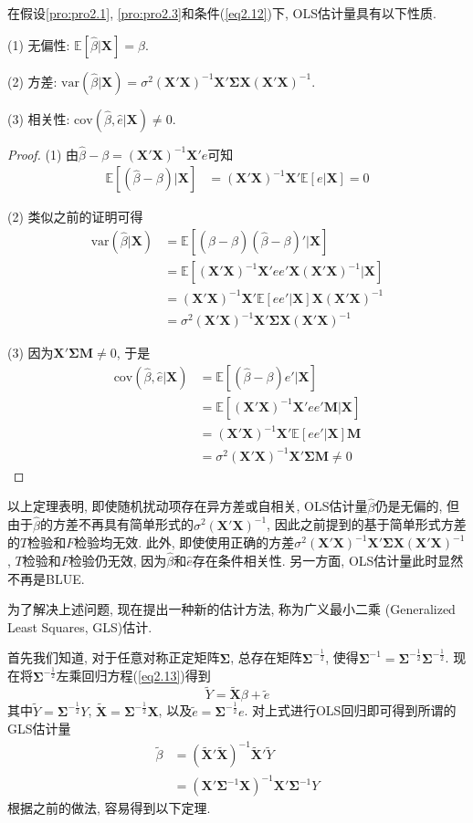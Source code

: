 \documentclass[cn, 12pt, math=mtpro2, bibstyle=apa, blue, twocol]{elegantbook}
\newcommand{\E}{\mathbb{E}}
\newcommand{\var}{\text{var}}
\newcommand{\X}{\mathbold{X}}
\newcommand{\hb}{\hat{\beta}}
\begin{document}
\begin{theorem}
  在假设\ref{pro:pro2.1}, \ref{pro:pro2.3}和条件(\ref{eq2.12})下, OLS估计量具有以下性质.

  (1) 无偏性: $\E[\hb|\X]=\beta$.

  (2) 方差: $\var(\hb|\X)=\sigma^2(\X'\X)^{-1}\X'\mathbold{\Sigma}\X(\X'\X)^{-1}$.

  (3) 相关性: $\text{cov}(\hb,\hat{e}|\X)\neq0$.
\end{theorem}
\begin{proof}
  (1) 由$\hb-\beta=(\X'\X)^{-1}\X'e$可知
  \begin{align*}
  \E[(\hb-\beta)|\X]&=(\X'\X)^{-1}\X'\E[e|\X]=0
  \end{align*}

  (2) 类似之前的证明可得
  \begin{align*}
  \var(\hb|\X)&=\E[(\hb-\beta)(\hb-\beta)'|\X] \\
  &=\E[(\X'\X)^{-1}\X'ee'\X(\X'\X)^{-1}|\X] \\
  &=(\X'\X)^{-1}\X'\E[ee'|\X]\X(\X'\X)^{-1} \\
  &=\sigma^2(\X'\X)^{-1}\X'\mathbold{\Sigma}\X(\X'\X)^{-1}
  \end{align*}

  (3) 因为$\X'\mathbold{\Sigma}\mathbold{M}\neq0$, 于是
  \begin{align*}
  \text{cov}(\hb,\hat{e}|\X)&=\E[(\hb-\beta)e'|\X] \\
  &=\E[(\X'\X)^{-1}\X'ee'\mathbold{M}|\X] \\
  &=(\X'\X)^{-1}\X'\E[ee'|\X]\mathbold{M} \\
  &=\sigma^2(\X'\X)^{-1}\X'\mathbold{\Sigma}\mathbold{M}\neq0
  \end{align*}
\end{proof}
以上定理表明, 即使随机扰动项存在异方差或自相关, OLS估计量$\hb$仍是无偏的, 但由于$\hb$的方差不再具有简单形式的$\sigma^2(\X'\X)^{-1}$, 因此之前提到的基于简单形式方差的$T$检验和$F$检验均无效. 此外, 即使使用正确的方差$\sigma^2(\X'\X)^{-1}\X'\mathbold{\Sigma}\X(\X'\X)^{-1}$, $T$检验和$F$检验仍无效, 因为$\hb$和$\hat{e}$存在条件相关性. 另一方面, OLS估计量此时显然不再是BLUE.

为了解决上述问题, 现在提出一种新的估计方法, 称为广义最小二乘 (Generalized Least Squares, GLS)估计.

首先我们知道, 对于任意对称正定矩阵$\mathbold{\Sigma}$, 总存在矩阵$\mathbold{\Sigma}^{-\frac{1}{2}}$, 使得$\mathbold{\Sigma}^{-1}=\mathbold{\Sigma}^{-\frac{1}{2}}\mathbold{\Sigma}^{-\frac{1}{2}}$. 现在将$\mathbold{\Sigma}^{-\frac{1}{2}}$左乘回归方程(\ref{eq2.13})得到
$$\tilde{Y}=\tilde{\X}\beta+\tilde{e}$$
其中$\tilde{Y}=\mathbold{\Sigma}^{-\frac{1}{2}}Y$, $\tilde{\X}=\mathbold{\Sigma}^{-\frac{1}{2}}\X$, 以及$\tilde{e}=\mathbold{\Sigma}^{-\frac{1}{2}}e$. 对上式进行OLS回归即可得到所谓的GLS估计量
\begin{align*}
\tilde{\beta}&=(\tilde{\X}{'}\tilde{\X})^{-1}\tilde{\X}{'}\tilde{Y} \\
&=(\X'\mathbold{\Sigma}^{-1}\X)^{-1}\X'\mathbold{\Sigma}^{-1}Y
\end{align*}
根据之前的做法, 容易得到以下定理.
\end{document}
